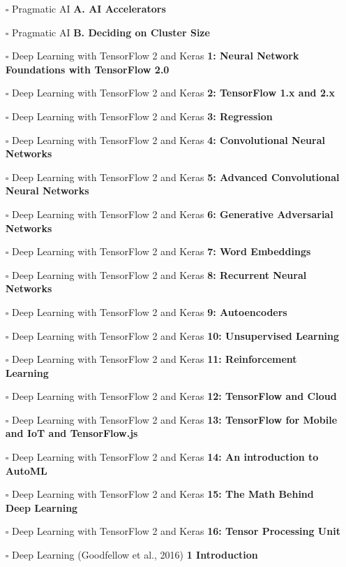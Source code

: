 \documentclass[a4, landscape, 12pt]{article}
\newcommand{\checkbox}{$\square$}%
\begin{document}
\begin{itemize}
{}
\item [\checkbox]  Pragmatic AI \textbf{ A. AI Accelerators
}
\item [\checkbox]  Pragmatic AI \textbf{ B. Deciding on Cluster Size
}
\item [\checkbox]  Deep Learning with TensorFlow 2 and Keras \textbf{ 1: Neural Network Foundations with TensorFlow 2.0
}
\item [\checkbox]  Deep Learning with TensorFlow 2 and Keras \textbf{ 2: TensorFlow 1.x and 2.x
}
\item [\checkbox]  Deep Learning with TensorFlow 2 and Keras \textbf{ 3: Regression
}
\item [\checkbox]  Deep Learning with TensorFlow 2 and Keras \textbf{ 4: Convolutional Neural Networks
}
\item [\checkbox]  Deep Learning with TensorFlow 2 and Keras \textbf{ 5: Advanced Convolutional Neural Networks
}
\item [\checkbox]  Deep Learning with TensorFlow 2 and Keras \textbf{ 6: Generative Adversarial Networks
}
\item [\checkbox]  Deep Learning with TensorFlow 2 and Keras \textbf{ 7: Word Embeddings
}
\item [\checkbox]  Deep Learning with TensorFlow 2 and Keras \textbf{ 8: Recurrent Neural Networks
}
\item [\checkbox]  Deep Learning with TensorFlow 2 and Keras \textbf{ 9: Autoencoders
}
\item [\checkbox]  Deep Learning with TensorFlow 2 and Keras \textbf{ 10: Unsupervised Learning
}
\item [\checkbox]  Deep Learning with TensorFlow 2 and Keras \textbf{ 11: Reinforcement Learning
}
\item [\checkbox]  Deep Learning with TensorFlow 2 and Keras \textbf{ 12: TensorFlow and Cloud
}
\item [\checkbox]  Deep Learning with TensorFlow 2 and Keras \textbf{ 13: TensorFlow for Mobile and IoT and TensorFlow.js
}
\item [\checkbox]  Deep Learning with TensorFlow 2 and Keras \textbf{ 14: An introduction to AutoML
}
\item [\checkbox]  Deep Learning with TensorFlow 2 and Keras \textbf{ 15: The Math Behind Deep Learning
}
\item [\checkbox]  Deep Learning with TensorFlow 2 and Keras \textbf{ 16: Tensor Processing Unit
}
\item [\checkbox]  Deep Learning (Goodfellow et al., 2016) \textbf{ 1 Introduction
}
\end{itemize}
\end{document}
